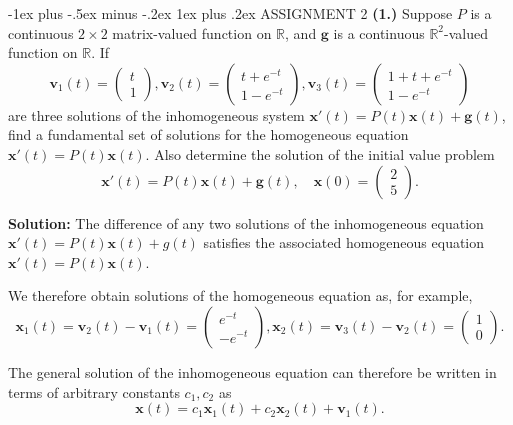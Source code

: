 \documentclass[10pt,landscape]{article}
\makeatletter
\renewcommand{\subsubsection}{\@startsection{subsubsection}{3}{0mm}%
                                {-1ex plus -.5ex minus -.2ex}%
                                {1ex plus .2ex}%
                                {\normalfont\small\bfseries}}
\makeatother
\begin{document}
\begin{multicols}{2}
\subsubsection{ASSIGNMENT 2}
\textbf{(1.)} Suppose \( P \) is a continuous \( 2 \times 2 \) matrix-valued function on \( \mathbb{R} \), and \( \mathbf{g} \) is a continuous \( \mathbb{R}^2 \)-valued function on \( \mathbb{R} \). If\\
\[
\mathbf{v}_1(t) =
\begin{pmatrix}
t \\
1
\end{pmatrix}, 
\mathbf{v}_2(t) =
\begin{pmatrix}
t + e^{-t} \\
1 - e^{-t}
\end{pmatrix}, 
\mathbf{v}_3(t) =
\begin{pmatrix}
1 + t + e^{-t} \\
1 - e^{-t}
\end{pmatrix}
\]
are three solutions of the inhomogeneous system \( \mathbf{x}'(t) = P(t)\mathbf{x}(t) + \mathbf{g}(t) \), find a fundamental set of solutions for the homogeneous equation \( \mathbf{x}'(t) = P(t)\mathbf{x}(t) \). Also determine the solution of the initial value problem\\
\[
\mathbf{x}'(t) = P(t)\mathbf{x}(t) + \mathbf{g}(t), \quad \mathbf{x}(0) =
\begin{pmatrix}
2 \\
5
\end{pmatrix}.
\]

\textbf{Solution:} The difference of any two solutions of the inhomogeneous equation \( \mathbf{x}'(t) = P(t)\mathbf{x}(t) + g(t) \) satisfies the associated homogeneous equation \( \mathbf{x}'(t) = P(t)\mathbf{x}(t) \).

We therefore obtain solutions of the homogeneous equation as, for example,\\
\[
\mathbf{x}_1(t) = \mathbf{v}_2(t) - \mathbf{v}_1(t) =
\begin{pmatrix}
e^{-t} \\
-e^{-t}
\end{pmatrix}, 
\mathbf{x}_2(t) = \mathbf{v}_3(t) - \mathbf{v}_2(t) =
\begin{pmatrix}
1 \\
0
\end{pmatrix}.
\]


The general solution of the inhomogeneous equation can therefore be written in terms of arbitrary constants \( c_1, c_2 \) as\\
\[
\mathbf{x}(t) = c_1 \mathbf{x}_1(t) + c_2 \mathbf{x}_2(t) + \mathbf{v}_1(t).
\]



\end{multicols}
\end{document}
